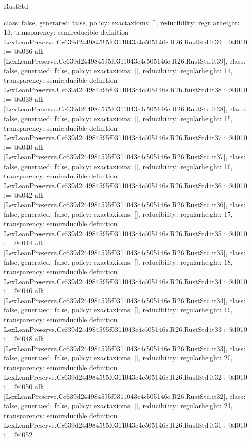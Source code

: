 \begin{lexlean}{RustStd}
\begin{coremodule}
{  class: false,
  generated: false,
  policy: exact{axioms: []},
  reducibility: regular{height: 13},
  transparency: semireducible
}
definition LexLeanPreserve.Cc639d244984595f0311043c4c505146e.R26.RustStd.it39 : @4010 := @4036 {
  all: [LexLeanPreserve.Cc639d244984595f0311043c4c505146e.R26.RustStd.it39],
  class: false,
  generated: false,
  policy: exact{axioms: []},
  reducibility: regular{height: 14},
  transparency: semireducible
}
definition LexLeanPreserve.Cc639d244984595f0311043c4c505146e.R26.RustStd.it38 : @4010 := @4038 {
  all: [LexLeanPreserve.Cc639d244984595f0311043c4c505146e.R26.RustStd.it38],
  class: false,
  generated: false,
  policy: exact{axioms: []},
  reducibility: regular{height: 15},
  transparency: semireducible
}
definition LexLeanPreserve.Cc639d244984595f0311043c4c505146e.R26.RustStd.it37 : @4010 := @4040 {
  all: [LexLeanPreserve.Cc639d244984595f0311043c4c505146e.R26.RustStd.it37],
  class: false,
  generated: false,
  policy: exact{axioms: []},
  reducibility: regular{height: 16},
  transparency: semireducible
}
definition LexLeanPreserve.Cc639d244984595f0311043c4c505146e.R26.RustStd.it36 : @4010 := @4042 {
  all: [LexLeanPreserve.Cc639d244984595f0311043c4c505146e.R26.RustStd.it36],
  class: false,
  generated: false,
  policy: exact{axioms: []},
  reducibility: regular{height: 17},
  transparency: semireducible
}
definition LexLeanPreserve.Cc639d244984595f0311043c4c505146e.R26.RustStd.it35 : @4010 := @4044 {
  all: [LexLeanPreserve.Cc639d244984595f0311043c4c505146e.R26.RustStd.it35],
  class: false,
  generated: false,
  policy: exact{axioms: []},
  reducibility: regular{height: 18},
  transparency: semireducible
}
definition LexLeanPreserve.Cc639d244984595f0311043c4c505146e.R26.RustStd.it34 : @4010 := @4046 {
  all: [LexLeanPreserve.Cc639d244984595f0311043c4c505146e.R26.RustStd.it34],
  class: false,
  generated: false,
  policy: exact{axioms: []},
  reducibility: regular{height: 19},
  transparency: semireducible
}
definition LexLeanPreserve.Cc639d244984595f0311043c4c505146e.R26.RustStd.it33 : @4010 := @4048 {
  all: [LexLeanPreserve.Cc639d244984595f0311043c4c505146e.R26.RustStd.it33],
  class: false,
  generated: false,
  policy: exact{axioms: []},
  reducibility: regular{height: 20},
  transparency: semireducible
}
definition LexLeanPreserve.Cc639d244984595f0311043c4c505146e.R26.RustStd.it32 : @4010 := @4050 {
  all: [LexLeanPreserve.Cc639d244984595f0311043c4c505146e.R26.RustStd.it32],
  class: false,
  generated: false,
  policy: exact{axioms: []},
  reducibility: regular{height: 21},
  transparency: semireducible
}
definition LexLeanPreserve.Cc639d244984595f0311043c4c505146e.R26.RustStd.it31 : @4010 := @4052 {
}
\end{coremodule}
\end{lexlean}

